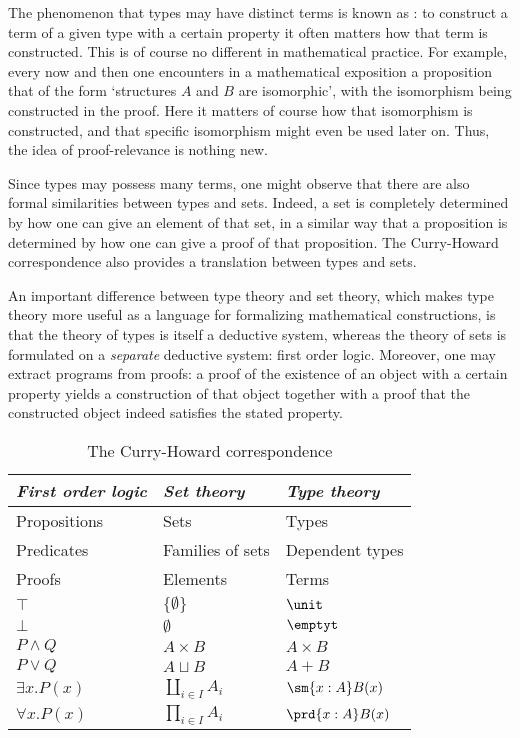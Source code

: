 The phenomenon that types may have distinct terms is known as : to construct a term of a given type with a certain property it often matters how that term is constructed. This is of course no different in mathematical practice. For example, every now and then one encounters in a mathematical exposition a proposition that of the form `structures $A$ and $B$ are isomorphic', with the isomorphism being constructed in the proof. Here it matters of course how that isomorphism is constructed, and that specific isomorphism might even be used later on. Thus, the idea of proof-relevance is nothing new.

Since types may possess many terms, one might observe that there are also formal similarities between types and sets. Indeed, a set is completely determined by how one can give an element of that set, in a similar way that a proposition is determined by how one can give a proof of that proposition. The Curry-Howard correspondence also provides a translation between types and sets.

An important difference between type theory and set theory, which makes type theory more useful as a language for formalizing mathematical constructions, is that the theory of types is itself a deductive system, whereas the theory of sets is formulated on a \emph{separate} deductive system: first order logic. Moreover, one may extract programs from proofs: a proof of the existence of an object with a certain property yields a construction of that object together with a proof that the constructed object indeed satisfies the stated property.

\begin{table}\label{table:ch}
\caption{The Curry-Howard correspondence}
\begin{center}
\begin{tabular}{lll}
\toprule
\emph{First order logic} & \emph{Set theory} & \emph{Type theory}\\
\midrule
Propositions & Sets & Types\\
Predicates & Families of sets & Dependent types\\
Proofs & Elements & Terms \\
$\top$ & $\{\emptyset\}$ & $\unit$\\
$\bot$ & $\emptyset$ & $\emptyt$ \\
$P \land Q$ & $A \times B$ & $A \times B$ \\
$P \vee Q$ & $A \sqcup B$ & $A + B$ \\
$\exists x.P(x)$ & $\coprod_{i\in I}A_i$ & $\sm{x:A}B(x)$ \\
$\forall x.P(x)$ & $\prod_{i\in I}A_i$ & $\prd{x:A}B(x)$\\
\bottomrule
\end{tabular}
\end{center}
\end{table}

